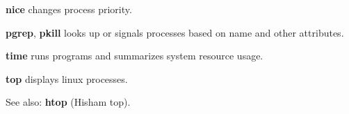 \begin{compactenum}
	\item [\cmdvar] \textbf{nice} changes process priority.
\end{compactenum}

\begin{compactenum}
	\item [\cmdvar] \textbf{pgrep}, \textbf{pkill} looks up or signals 
processes based on name and other attributes.
\end{compactenum}

\begin{compactenum}
	\item [\cmdvar] \textbf{time} runs programs and summarizes system resource usage. 
\end{compactenum}

\begin{compactenum}
	\item [\cmdvar] \textbf{top} displays linux processes.
	\item [\cmdvar] See also: \textbf{htop} (Hisham top).
\end{compactenum}
